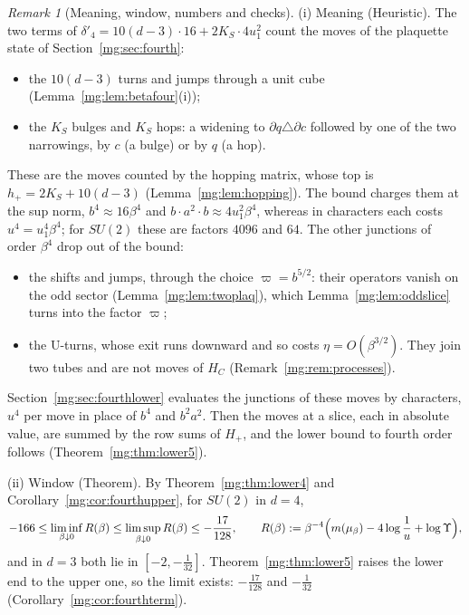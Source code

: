 \documentclass[11pt,a4paper]{article}
\theoremstyle{definition}
\theoremstyle{remark}
\newtheorem{remark}[theorem]{Remark}
\begin{document}
\begin{remark}[Meaning, window, numbers and checks]\label{mg:rem:betafour}
(i) Meaning (Heuristic). The two terms of $\delta'_4=10(d-3)\cdot16+2K_S\cdot4u_1^2$ count the moves of the plaquette state of Section~\ref{mg:sec:fourth}:
\begin{itemize}
\item the $10(d-3)$ turns and jumps through a unit cube (Lemma~\ref{mg:lem:betafour}(i));
\item the $K_S$ bulges and $K_S$ hops: a widening to $\partial q\triangle\partial c$ followed by one of the two narrowings, by $c$ (a bulge) or by $q$ (a hop).
\end{itemize}
These are the moves counted by the hopping matrix, whose top is $h_+=2K_S+10(d-3)$ (Lemma~\ref{mg:lem:hopping}). The bound charges them at the sup norm,
$b^4\approx16\beta^4$ and $b\cdot a^2\cdot b\approx4u_1^2\beta^4$, whereas in characters each costs $u^4=u_1^4\beta^4$; for $SU(2)$ these are factors $4096$ and $64$. The other
junctions of order $\beta^4$ drop out of the bound:
\begin{itemize}
\item the shifts and jumps, through the choice $\varpi=b^{5/2}$: their operators vanish on the odd sector (Lemma~\ref{mg:lem:twoplaq}), which
Lemma~\ref{mg:lem:oddslice} turns into the factor $\varpi$;
\item the U-turns, whose exit runs downward and so costs $\eta=O(\beta^{3/2})$. They join two tubes and are not moves of $H_C$ (Remark~\ref{mg:rem:processes}).
\end{itemize}
Section~\ref{mg:sec:fourthlower} evaluates the junctions of these moves by characters, $u^4$ per move in place of $b^4$ and $b^2a^2$. Then the moves at a slice, each in absolute
value, are summed by the row sums of $H_+$, and the lower bound to fourth order follows (Theorem~\ref{mg:thm:lower5}).

(ii) Window (Theorem). By Theorem~\ref{mg:thm:lower4} and Corollary~\ref{mg:cor:fourthupper}, for $SU(2)$ in $d=4$,
\[
-166\le\liminf_{\beta\downarrow0}R(\beta)\le\limsup_{\beta\downarrow0}R(\beta)\le-\frac{17}{128},\qquad R(\beta):=\beta^{-4}\Bigl(m(\mu_\beta)-4\log\frac1u+\log\Upsilon\Bigr),
\]
and in $d=3$ both lie in $[-2,-\frac1{32}]$. Theorem~\ref{mg:thm:lower5} raises the lower end to the upper one, so the limit exists:
$-\frac{17}{128}$ and $-\frac1{32}$ (Corollary~\ref{mg:cor:fourthterm}).


\end{remark}
\end{document}
